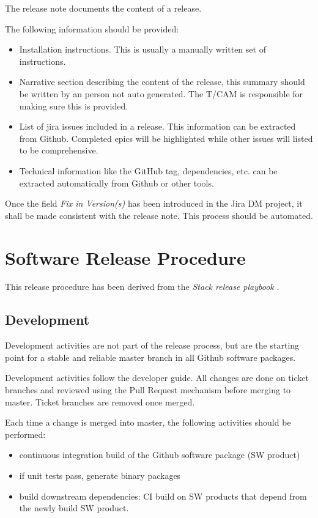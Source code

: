 The release note documents the content of a release.

The following information should be  provided:
\begin{itemize}
\item Installation instructions. This is usually a manually written set of instructions.
\item Narrative section describing the content of the release, this summary should be written by an person not auto generated.
The T/CAM is responsible for making sure this is provided.
\item List of jira issues included in a release. This information can be extracted from Github. Completed epics will be highlighted while other issues will  listed to be comprehensive.
\item Technical information like the GitHub tag, dependencies,  etc. can be extracted automatically from Github or other tools.
\end{itemize}

Once the field \textit{Fix in Version(s)} has been introduced in the Jira DM project, it shall be made consistent with the release note. This process should be automated.


\newpage
\section{Software Release Procedure} \label{sec:releaseprocedure}

This release procedure has been derived from the \textit{Stack release playbook} .

\subsection{Development} \label{sec:dev}

Development activities are not part of the release process, but are the starting point for a stable and reliable master branch in all Github software packages.

Development activities follow the  developer guide. All changes are done on ticket branches and reviewed using the Pull Request mechanism before merging to master.
Ticket branches are removed once merged.

Each time a change is merged into master, the following activities should be performed:

\begin{itemize}
\item continuous integration build of the Github software package (SW product)
\item if unit tests pass, generate binary packages
\item build downstream dependencies: CI build on SW products that depend from the newly build SW product.
\end{itemize}

